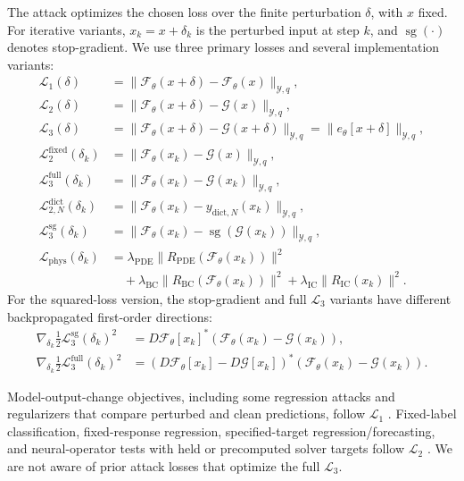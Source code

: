 \documentclass[letterpaper]{article} %
\begin{document}
The attack optimizes the chosen loss over the finite perturbation $\delta$,
with $x$ fixed. For iterative variants, $x_k=x+\delta_k$ is the perturbed input
at step $k$, and $\operatorname{sg}(\cdot)$ denotes stop-gradient. We use
three primary losses and several implementation variants:
\begin{equation*}
\begin{aligned}
\mathcal{L}_1(\delta)
&=\|\mathcal{F}_\theta(x+\delta)-\mathcal{F}_\theta(x)\|_{\mathcal{Y},q},\\
\mathcal{L}_2(\delta)
&=\|\mathcal{F}_\theta(x+\delta)-\mathcal{G}(x)\|_{\mathcal{Y},q},\\
\mathcal{L}_3(\delta)
&=\|\mathcal{F}_\theta(x+\delta)-\mathcal{G}(x+\delta)\|_{\mathcal{Y},q}=\|e_\theta[x+\delta]\|_{\mathcal{Y},q},\\
\mathcal{L}_2^{\mathrm{fixed}}(\delta_k)
&=\|\mathcal{F}_\theta(x_k)-\mathcal{G}(x)\|_{\mathcal{Y},q},\\
\mathcal{L}_3^{\mathrm{full}}(\delta_k)
&=\|\mathcal{F}_\theta(x_k)-\mathcal{G}(x_k)\|_{\mathcal{Y},q},\\
\mathcal{L}_{2,N}^{\mathrm{dict}}(\delta_k)
&=\|\mathcal{F}_\theta(x_k)-y_{\mathrm{dict},N}(x_k)\|_{\mathcal{Y},q},\\
\mathcal{L}_3^{\mathrm{sg}}(\delta_k)
&=\|\mathcal{F}_\theta(x_k)-\operatorname{sg}(\mathcal{G}(x_k))\|_{\mathcal{Y},q},\\
\mathcal{L}_{\mathrm{phys}}(\delta_k)
&=\lambda_{\mathrm{PDE}}\|R_{\mathrm{PDE}}(\mathcal{F}_\theta(x_k))\|^2\\
&\quad+\lambda_{\mathrm{BC}}\|R_{\mathrm{BC}}(\mathcal{F}_\theta(x_k))\|^2+\lambda_{\mathrm{IC}}\|R_{\mathrm{IC}}(x_k)\|^2.
\end{aligned}
\end{equation*}
For the squared-loss version, the stop-gradient and full $\mathcal{L}_3$
variants have different backpropagated first-order directions:
\begin{align*}
  \nabla_{\delta_k}\tfrac{1}{2}\mathcal{L}_3^{\mathrm{sg}}(\delta_k)^2
  &=
  D\mathcal{F}_\theta[x_k]^*
  (\mathcal{F}_\theta(x_k)-\mathcal{G}(x_k)),
  \nonumber\\
  \nabla_{\delta_k}\tfrac{1}{2}\mathcal{L}_3^{\mathrm{full}}(\delta_k)^2
  &=
  (D\mathcal{F}_\theta[x_k]-D\mathcal{G}[x_k])^*
  (\mathcal{F}_\theta(x_k)-\mathcal{G}(x_k)).
\end{align*}

Model-output-change objectives, including some regression attacks and
regularizers that compare perturbed and clean predictions, follow
$\mathcal{L}_1$
\citep{nguyen2018regression,mode2020mtsregression,liu2022forecastingattacks}.
Fixed-label classification, fixed-response regression, specified-target
regression/forecasting, and neural-operator tests with held or precomputed
solver targets follow $\mathcal{L}_2$
\citep{goodfellow2015explaining,madry2018towards,tong2018adversarialregression,ribeiro2023linearregression,liu2022forecastingattacks,adesoji2022evaluating}.
We are not aware of prior attack losses that optimize the full
$\mathcal{L}_3$.
\end{document}
